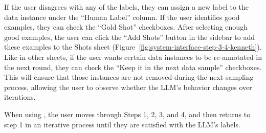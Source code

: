 \begin{itemize}
If the user disagrees with any of the labels, they can assign a new label to the data instance under the ``Human Label'' column. 
If the user identifies good examples, they can check the ``Gold Shot'' checkboxes. 
After selecting enough good examples, the user can click the ``Add Shots'' button in the sidebar to add these examples to the Shots sheet (Figure~\ref{fig:system-interface-step-3-4-kenneth}).
Like in other sheets, if the user wants certain data instances to be re-annotated in the next round, they can check the ``Keep it in the next data sample'' checkboxes. 
This will ensure that those instances are not removed during the next sampling process, allowing the user to observe whether the LLM's behavior changes over iterations.


\end{itemize}

When using \system, the user moves through Steps 1, 2, 3, and 4, and then returns to step 1 in an iterative process until they are satisfied with the LLM's labels.














